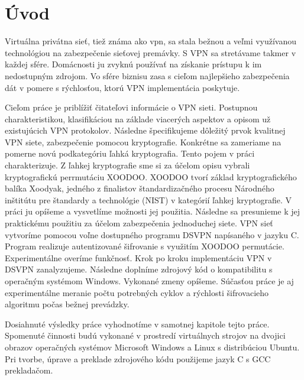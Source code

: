
{}

\chapter*{Úvod}
Virtuálna privátna sieť, tiež známa ako \acrshort{vpn}, sa stala bežnou a veľmi využívanou technológiou na zabezpečenie sieťovej premávky. S VPN sa stretávame takmer v každej sfére. Domácnosti ju zvyknú používať na získanie prístupu k im nedostupným zdrojom. Vo sfére biznisu zasa s cieľom najlepšieho zabezpečenia dát v pomere s rýchlosťou, ktorú VPN implementácia poskytuje. 

Cieľom práce je priblížiť čitateľovi informácie o VPN sieti. Postupnou charakteristikou, klasifikáciou na základe viacerých aspektov a opisom už existujúcich VPN protokolov. Následne špecifikujeme dôležitý prvok kvalitnej VPN siete, zabezpečenie pomocou kryptografie. Konkrétne sa zameriame na pomerne novú podkategóriu ľahká kryptografia. Tento pojem v práci charakterizuje. Z ľahkej kryptografie sme si za účelom opisu vybrali kryptografickú perrmutáciu XOODOO. XOODOO tvorí základ kryptografického balíka Xoodyak, jedného z finalistov štandardizačného procesu Národného inštitútu pre štandardy a technológie (NIST) v kategórií ľahkej kryptografie. V práci ju opíšeme a vysvetlíme možnosti jej použitia. Následne sa presunieme k jej praktickému použitiu za účelom zabezpečenia jednoduchej siete. VPN sieť vytvoríme pomocou voľne dostupného programu DSVPN napísaného v jazyku C. Program realizuje autentizované šifrovanie s využitím XOODOO permutácie. Experimentálne overíme funkčnosť. Krok po kroku implementáciu VPN v DSVPN zanalyzujeme. Následne doplníme zdrojový kód o kompatibilitu s operačným systémom Windows. Vykonané zmeny opíšeme. Súčasťou práce je aj experimentálne meranie počtu potrebných cyklov a rýchlosti šifrovacieho algoritmu počas bežnej prevádzky. 

Dosiahnuté výsledky práce vyhodnotíme v samotnej kapitole tejto práce. Spomenuté činnosti budú vykonané v prostredí virtuálnych strojov na dvojici obrazov operačných systémov Microsoft Windows a Linux s distribúciou Ubuntu. Pri tvorbe, úprave a preklade zdrojového kódu použijeme jazyk C s GCC prekladačom. 



